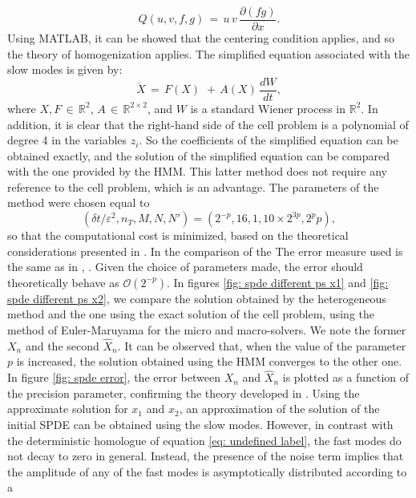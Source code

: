 \begin{equation*}
    Q(u,v,f,g) \,=\, u \, v \, \frac{{\partial}(fg)}{{\partial}x}.
\end{equation*}
Using MATLAB, it can be showed that the centering condition applies, and so the theory of homogenization applies.
The simplified equation associated with the slow modes is given by:
\begin{equation}
    \dot X \,=\, F(X) \, \,+\, A(X) \, \frac{dW}{dt},
\end{equation}
where $X,F\,{\in}\,\mathbb R^2$, $A \,{\in}\,\mathbb R^{2{\times}2}$, and $W$ is a standard Wiener process in $\mathbb R^2$.
In addition, it is clear that the right-hand side of the cell problem is a polynomial of degree 4 in the variables $z_i$.
So the coefficients of the simplified equation can be obtained exactly, and the solution of the simplified equation can be compared with the one provided by the HMM.
This latter method does not require any reference to the cell problem, which is an advantage.
The parameters of the method were chosen equal to $$ ({\delta}t/{\varepsilon}^2, n_T, M,N, N') = ( 2^{-p}, 16, 1 , 10{\times}2^{3p}, 2^pp),$$ so that the computational cost is minimized, based on the theoretical considerations presented in \cite{weinan2005analysis}.
In the comparison of the The error measure used is the same as in
\cite{weinan2005analysis}, . Given the choice of
parameters made, the error should theoretically behave as $\mathcal O(2^{- p
})$.  In figures \ref{fig: spde different ps x1} and \ref{fig: spde different
    ps x2}, we compare the solution obtained by the heterogeneous method and
the one using the exact solution of the cell problem, using the method of Euler-Maruyama for the micro and macro-solvers.
We note the former $X_n$ and the second $\hat X_n$.
It can be observed that, when the value of the parameter $p$ is increased, the solution obtained using the HMM converges to the other one.
In figure \ref{fig: spde error}, the error between $X_n$ and $\hat X_n$ is plotted as a function of the precision parameter, confirming the theory developed in \citep{abdulle2012numerical,weinan2005analysis}.
Using the approximate solution for $x_1$ and $x_2$, an approximation of the solution of the initial SPDE can be obtained using the slow modes.
However, in contrast with the deterministic homologue of equation \eqref{eq: undefined label}, the fast modes do not  decay to zero in general.
Instead, the presence of the noise term implies that the amplitude of any of the fast modes is asymptotically distributed according to a
